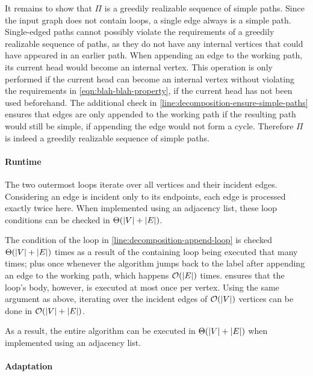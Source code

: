 It remains to show that ${\Pi}$ is a greedily realizable sequence of simple paths. Since the input graph does not contain loops, a single edge always is a simple path. Single-edged paths cannot possibly violate the requirements of a greedily realizable sequence of paths, as they do not have any internal vertices that could have appeared in an earlier path. When appending an edge to the working path, its current head would become an internal vertex. This operation is only performed if the current head can become an internal vertex without violating the requirements in \cref{eqn:blah-blah-property}, \ie{} if the current head has not been used beforehand. The additional check in \cref{line:decomposition-ensure-simple-paths} ensures that edges are only appended to the working path if the resulting path would still be simple, \ie{} if appending the edge would not form a cycle. Therefore ${\Pi}$ is indeed a greedily realizable sequence of simple paths.



\paragraph{Runtime}

The two outermost loops iterate over all vertices and their incident edges. Considering an edge is incident only to its endpoints, each edge is processed exactly twice here. When implemented using an adjacency list, these loop conditions can be checked in ${\Theta(\left\lvert V\right\rvert + \left\lvert E\right\rvert)}$.

The condition of the  loop in \cref{line:decomposition-append-loop} is checked ${\Theta(\left\lvert V\right\rvert + \left\lvert E\right\rvert)}$ times as a result of the containing loop being executed that many times; plus once whenever the algorithm jumps back to the  label after appending an edge to the working path, which happens ${\mathcal{O}(\left\lvert E\right\rvert)}$ times.  ensures that the loop's body, however, is executed at most once per vertex. Using the same argument as above, iterating over the incident edges of ${\mathcal{O}(\left\lvert V\right\rvert)}$ vertices can be done in ${\mathcal{O}(\left\lvert V\right\rvert + \left\lvert E\right\rvert)}$.

As a result, the entire algorithm can be executed in ${\Theta(\left\lvert V\right\rvert + \left\lvert E\right\rvert)}$ when implemented using an adjacency list.



\paragraph{Adaptation}

